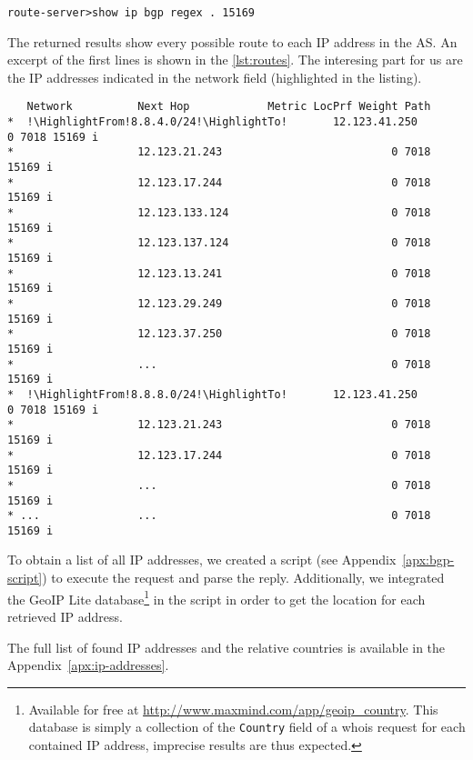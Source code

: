 \documentclass[10pt,a4paper,twoside,onecolumn]{article}
\begin{document}
\lstset{caption=,label=lst:show-ip,language=bash,numbers=none}
\begin{lstlisting}
route-server>show ip bgp regex . 15169
\end{lstlisting}

The returned results show every possible route to each IP address in the AS. An excerpt of the first lines is shown in the \autoref{lst:routes}. The interesing part for us are the IP addresses indicated in the network field (highlighted in the listing).

\lstset{caption=,label=lst:routes,language=bash,numbers=none}
\begin{lstlisting}
   Network          Next Hop            Metric LocPrf Weight Path
*  !\HighlightFrom!8.8.4.0/24!\HighlightTo!       12.123.41.250                          0 7018 15169 i
*                   12.123.21.243                          0 7018 15169 i
*                   12.123.17.244                          0 7018 15169 i
*                   12.123.133.124                         0 7018 15169 i
*                   12.123.137.124                         0 7018 15169 i
*                   12.123.13.241                          0 7018 15169 i
*                   12.123.29.249                          0 7018 15169 i
*                   12.123.37.250                          0 7018 15169 i
*                   ...                                    0 7018 15169 i
*  !\HighlightFrom!8.8.8.0/24!\HighlightTo!       12.123.41.250                          0 7018 15169 i
*                   12.123.21.243                          0 7018 15169 i
*                   12.123.17.244                          0 7018 15169 i
*                   ...                                    0 7018 15169 i
* ...               ...                                    0 7018 15169 i
\end{lstlisting}

To obtain a list of all IP addresses, we created a script (see Appendix~\ref{apx:bgp-script}) to execute the request and parse the reply. Additionally, we integrated the GeoIP Lite database\footnote{Available for free at \url{http://www.maxmind.com/app/geoip_country}. This database is simply a collection of the \texttt{Country} field of a whois request for each contained IP address, imprecise results are thus expected.} in the script in order to get the location for each retrieved IP address.

The full list of found IP addresses and the relative countries is available in the Appendix~\ref{apx:ip-addresses}.
\end{document}
